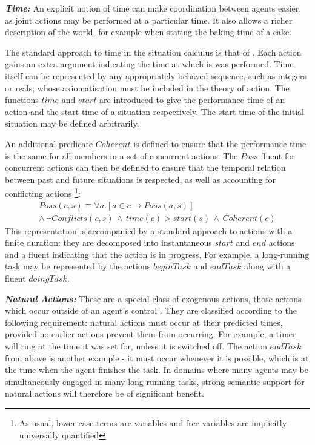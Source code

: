 \documentclass[times, 10pt, twocolumn]{article}
\begin{document}
\textbf{\emph{Time:}} An explicit notion of time can make coordination
between agents easier, as joint actions may be performed at a particular
time. It also allows a richer description of the world, for example
when stating the baking time of a cake.

The standard approach to time in the situation calculus is that of
\cite{reiter96sc_nat_conc,pinto94temporal}. Each action gains an
extra argument indicating the time at which is was performed. Time
itself can be represented by any appropriately-behaved sequence, such
as integers or reals, whose axiomatisation must be included in the
theory of action. The functions $time$ and $start$ are introduced
to give the performance time of an action and the start time of a
situation respectively. The start time of the initial situation may
be defined arbitrarily.

An additional predicate $Coherent$ is defined to ensure that the
performance time is the same for all members in a set of concurrent
actions. The $Poss$ fluent for concurrent actions can then be defined
to ensure that the temporal relation between past and future situations
is respected, as well as accounting for conflicting actions%
\footnote{As usual, lower-case terms are variables and free variables are implicitly
universally quantified%
}:\begin{multline*}
Poss(c,s)\equiv\forall a.\left[a\in c\rightarrow Poss(a,s)\right]\\
\wedge\,\neg Conflicts(c,s)\,\wedge\, time(c)>start(s)\,\wedge\, Coherent(c)\end{multline*}
 This representation is accompanied by a standard approach to actions
with a finite duration: they are decomposed into instantaneous $start$
and $end$ actions and a fluent indicating that the action is in progress.
For example, a long-running task may be represented by the actions
$beginTask$ and $endTask$ along with a fluent $doingTask$.

\textbf{\emph{Natural Actions:}} These are a special class of exogenous
actions, those actions which occur outside of an agent's control \cite{reiter96sc_nat_conc}.
They are classified according to the following requirement: natural
actions must occur at their predicted times, provided no earlier actions
prevent them from occurring. For example, a timer will ring at the
time it was set for, unless it is switched off. The action $endTask$
from above is another example - it must occur whenever it is possible,
which is at the time when the agent finishes the task. In domains
where many agents may be simultaneously engaged in many long-running
tasks, strong semantic support for natural actions will therefore
be of significant benefit.
\end{document}
